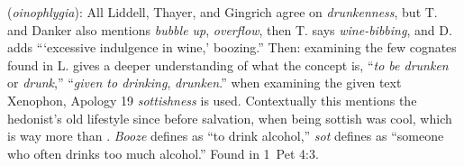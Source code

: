 \item[Wine alcoholic,]

(\textit{oinophlygia}):
All Liddell, Thayer, and Gingrich agree on \emph{drunkenness}, but T. and Danker also mentions \emph{bubble up}, \emph{overflow}, then T. says \emph{wine-bibbing}, and D. adds ```excessive indulgence in wine,' boozing.''
Then: examining the few cognates found in L. gives a deeper understanding of what the concept is,  ``\emph{to be drunken} or \emph{drunk},''  ``\emph{given to drinking}, \emph{drunken}.''
when examining the given text Xenophon, Apology 19 \emph{sottishness} is used.
Contextually this mentions the hedonist's old lifestyle since before salvation, when being sottish was cool, which is way more than . \emph{Booze} defines as ``to drink alcohol,'' \emph{sot} defines as ``someone who often drinks too much alcohol.''
Found in 1~Pet 4:3.
